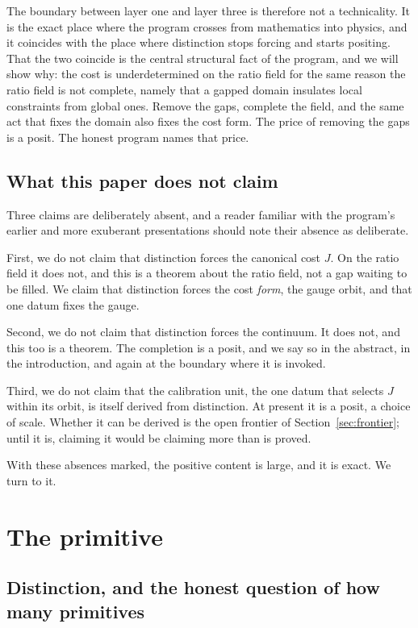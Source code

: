\documentclass[11pt,a4paper]{article}
\theoremstyle{definition}
\theoremstyle{remark}
\begin{document}
The boundary between layer one and layer three is therefore not a technicality. It
is the exact place where the program crosses from mathematics into physics, and it
coincides with the place where distinction stops forcing and starts positing. That
the two coincide is the central structural fact of the program, and we will show
why: the cost is underdetermined on the ratio field for the same reason the ratio
field is not complete, namely that a gapped domain insulates local constraints
from global ones. Remove the gaps, complete the field, and the same act that fixes
the domain also fixes the cost form. The price of removing the gaps is a posit.
The honest program names that price.

\subsection{What this paper does not claim}

Three claims are deliberately absent, and a reader familiar with the program's
earlier and more exuberant presentations should note their absence as deliberate.

First, we do not claim that distinction forces the canonical cost $J$. On the
ratio field it does not, and this is a theorem about the ratio field, not a gap
waiting to be filled. We claim that distinction forces the cost \emph{form}, the
gauge orbit, and that one datum fixes the gauge.

Second, we do not claim that distinction forces the continuum. It does not, and
this too is a theorem. The completion is a posit, and we say so in the abstract,
in the introduction, and again at the boundary where it is invoked.

Third, we do not claim that the calibration unit, the one datum that selects $J$
within its orbit, is itself derived from distinction. At present it is a posit, a
choice of scale. Whether it can be derived is the open frontier of
Section~\ref{sec:frontier}; until it is, claiming it would be claiming more than is
proved.

With these absences marked, the positive content is large, and it is exact. We
turn to it.

\section{The primitive}\label{sec:primitive}

\subsection{Distinction, and the honest question of how many primitives}
\end{document}
